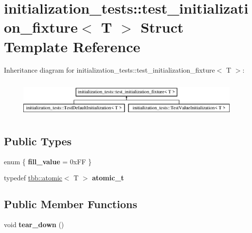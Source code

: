 \hypertarget{structinitialization__tests_1_1test__initialization__fixture}{}\section{initialization\+\_\+tests\+:\+:test\+\_\+initialization\+\_\+fixture$<$ T $>$ Struct Template Reference}
\label{structinitialization__tests_1_1test__initialization__fixture}
Inheritance diagram for initialization\+\_\+tests\+:\+:test\+\_\+initialization\+\_\+fixture$<$ T $>$\+:\begin{figure}[H]
\begin{center}
\leavevmode
\includegraphics[height=1.951219cm]{structinitialization__tests_1_1test__initialization__fixture}
\end{center}
\end{figure}
\subsection*{Public Types}
\begin{DoxyCompactItemize}
\item 
\hypertarget{structinitialization__tests_1_1test__initialization__fixture_ab30e3245ae0250e007eda2a37552611e}{}enum \{ {\bfseries fill\+\_\+value} = 0x\+F\+F
 \}\label{structinitialization__tests_1_1test__initialization__fixture_ab30e3245ae0250e007eda2a37552611e}

\item 
\hypertarget{structinitialization__tests_1_1test__initialization__fixture_a249e62684bc7dc8d41347e0e21f5d86d}{}typedef \hyperlink{structtbb_1_1atomic}{tbb\+::atomic}$<$ T $>$ {\bfseries atomic\+\_\+t}\label{structinitialization__tests_1_1test__initialization__fixture_a249e62684bc7dc8d41347e0e21f5d86d}

\end{DoxyCompactItemize}
\subsection*{Public Member Functions}
\begin{DoxyCompactItemize}
\item 
\hypertarget{structinitialization__tests_1_1test__initialization__fixture_a3ab0ca8f4fa251b76d46cffb921d2538}{}void {\bfseries tear\+\_\+down} ()\label{structinitialization__tests_1_1test__initialization__fixture_a3ab0ca8f4fa251b76d46cffb921d2538}

\end{DoxyCompactItemize}
